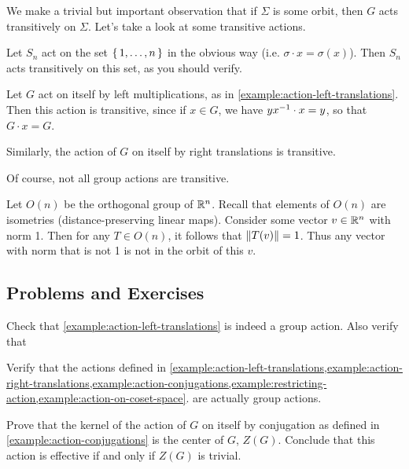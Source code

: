 \documentclass[./main.tex]{subfiles}
\begin{document}
We make a trivial but important observation that if $\Sigma$ is some orbit, then
$G$ acts transitively on $\Sigma$. Let's take a look at some transitive actions.
\begin{example}
    Let $S_n$ act on the set $\set{1, \dots, n}$ in the obvious way (i.e.
    $\sigma \cdot x = \sigma(x)$). Then $S_n$ acts transitively on this set, as
    you should verify.
\end{example}
\begin{example}
    Let $G$ act on itself by left multiplications, as in
    \cref{example:action-left-translations}. Then this action is transitive,
    since if $x \in G$, we have $yx^{-1} \cdot x = y$, so that $G \cdot x = G$.
\end{example}
\begin{example}
    Similarly, the action of $G$ on itself by right translations is transitive. 
\end{example}

Of course, not all group actions are transitive.
\begin{example}
    Let $O(n)$ be the orthogonal group of $\mathbb{R}^n$. Recall that elements of
    $O(n)$ are isometries (distance-preserving linear maps). Consider some
    vector $v \in \mathbb{R}^n$ with norm 1. Then for any $T \in O(n)$, it follows that
    $\norm{T(v)} = 1$. Thus any vector with norm that is not 1 is not in the
    orbit of this $v$. 
\end{example}

\subsection{Problems and Exercises}

\begin{exercise}
    Check that \cref{example:action-left-translations} is indeed a group action.
    Also verify that 
\end{exercise}

\begin{exercise}
    Verify that the actions defined in
    \cref{example:action-left-translations,example:action-right-translations,example:action-conjugations,example:restricting-action,example:action-on-coset-space}.
    are actually group actions.
\end{exercise}

\begin{exercise}
\label{exercise:kernel-of-conjugation-action}
    Prove that the kernel of the action of $G$ on itself by conjugation as
    defined in \cref{example:action-conjugations} is the center of $G$, $Z(G)$.
    Conclude that this action is effective if and only if $Z(G)$ is trivial.
\end{exercise}
\end{document}
